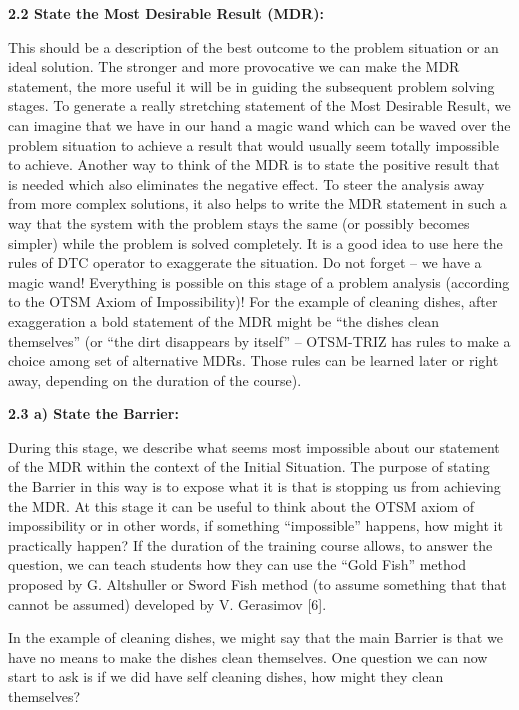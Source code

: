 \documentclass[11pt,a4paper]{article}
\begin{document}
\textbf{2.2 State the Most Desirable Result (MDR):}

This should be a description of the best outcome to the problem situation or
an ideal solution.  The stronger and more provocative we can make the MDR
statement, the more useful it will be in guiding the subsequent problem
solving stages.  To generate a really stretching statement of the Most
Desirable Result, we can imagine that we have in our hand a magic wand which
can be waved over the problem situation to achieve a result that would usually
seem totally impossible to achieve.  Another way to think of the MDR is to
state the positive result that is needed which also eliminates the negative
effect.  To steer the analysis away from more complex solutions, it also helps
to write the MDR statement in such a way that the system with the problem
stays the same (or possibly becomes simpler) while the problem is solved
completely.  It is a good idea to use here the rules of DTC operator to
exaggerate the situation. Do not forget – we have a magic wand!  Everything is
possible on this stage of a problem analysis (according to the OTSM Axiom of
Impossibility)! For the example of cleaning dishes, after exaggeration a bold
statement of the MDR might be “the dishes clean themselves” (or “the dirt
disappears by itself” -- OTSM-TRIZ has rules to make a choice among set of
alternative MDRs. Those rules can be learned later or right away, depending on
the duration of the course).

\textbf{2.3 a) State the Barrier:}

During this stage, we describe what seems most impossible about our statement
of the MDR within the context of the Initial Situation. The purpose of stating
the Barrier in this way is to expose what it is that is stopping us from
achieving the MDR.  At this stage it can be useful to think about the OTSM
axiom of impossibility or in other words, if something “impossible” happens,
how might it practically happen? If the duration of the training course
allows, to answer the question, we can teach students how they can use the
“Gold Fish” method proposed by G. Altshuller or Sword Fish method (to assume
something that that cannot be assumed) developed by V. Gerasimov [6].

In the example of cleaning dishes, we might say that the main Barrier is that
we have no means to make the dishes clean themselves.  One question we can now
start to ask is if we did have self cleaning dishes, how might they clean
themselves?
\end{document}
